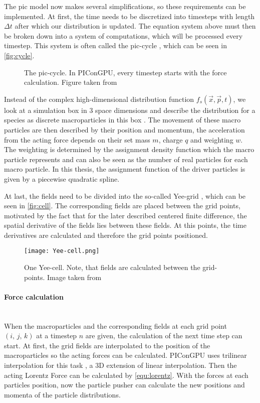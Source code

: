 \documentclass[bachelor_thesis]{subfiles}
\begin{document}
The \gls{pic} model now makes several simplifications, so these requirements can be implemented.
At first, the time needs to be discretized into timesteps with length $\Delta t$ after which our distribution is updated. The equation system above must then be broken down into a system of computations, which will be processed every timestep.
This system is often called the \gls{pic}-cycle \cite{Huebl2019}, which can be seen in \autoref{fig:cycle}.

\begin{figure}
	\centering
	\resizebox{0.8\textwidth}{!}{}
	\caption{The \gls{pic}-cycle. In PIConGPU, every timestep starts with the force calculation. Figure taken from \cite{Pausch2019}}
	\label{fig:cycle}
\end{figure}

Instead of the complex high-dimensional distribution function $f_s(\vec{x}, \vec{p}, t)$, we look at a simulation box in 3 space dimensions and describe the distribution for a species as discrete macroparticles in this box \cite{Burau2010}.
The movement of these macro particles are then described by their position and momentum, the acceleration from the acting force depends on their set mass $m$, charge $q$ and weighting $w$.
The weighting is determined by the assignment density function which the macro particle represents and can also be seen as the number of real particles for each macro particle.
In this thesis, the assignment function of the driver particles is given by a piecewise quadratic spline.

At last, the fields need to be divided into the so-called Yee-grid \cite{Yee1966}, which can be seen in \autoref{fig:cell}. The corresponding fields are placed between the grid points, motivated by the fact that for the later described centered finite difference, 
the spatial derivative of the fields lies between these fields. At this points, the time derivatives are calculated and therefore the grid points positioned.

\begin{figure}
	\centering
	\texttt{[image: Yee-cell.png]}
	\caption{One Yee-cell. Note, that fields are calculated between the grid-points. Image taken from \cite{PICRepo}}
	\label{fig:cell}
\end{figure}

\paragraph*{Force calculation}\hspace{0pt} \\
When the macroparticles and the corresponding fields at each grid point $(i, \, j, \,k)$ at a timestep $n$ are given, the calculation of the next time step can start.
At first, the grid fields are interpolated to the position of the macroparticles so the acting forces can be calculated. PIConGPU uses trilinear interpolation for this task \cite{Huebl2019, PICRepo}, a 3D extension of linear interpolation.
Then the acting Lorentz Force can be calculated by \autoref{equ:lorentz}. With the forces at each particles position, now the particle pusher can calculate the new positions and momenta of the particle distributions.
\end{document}
